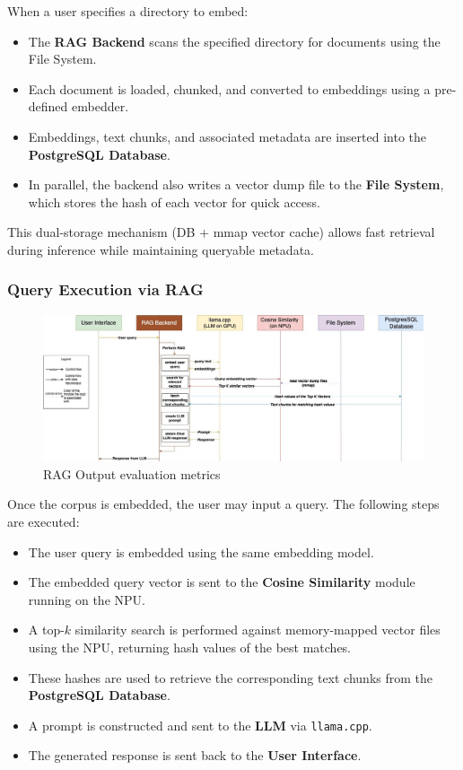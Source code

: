 {When a user specifies a directory to embed:

\begin{itemize}
    \item The \textbf{RAG Backend} scans the specified directory for documents using the File System.
    \item Each document is loaded, chunked, and converted to embeddings using a pre-defined embedder.
    \item Embeddings, text chunks, and associated metadata are inserted into the \textbf{PostgreSQL Database}.
    \item In parallel, the backend also writes a vector dump file to the \textbf{File System}, which stores the hash of each vector for quick access.
\end{itemize}

This dual-storage mechanism (DB + mmap vector cache) allows fast retrieval during inference while maintaining queryable metadata.

\subsubsection{Query Execution via RAG}

\begin{figure}[H]
    \centering
    \includegraphics[width=1.0\linewidth]{images/tldr-app-worklfow-pt3.jpg}
    \caption{RAG Output evaluation metrics ~\cite{cardenas2023rag}}
    \label{fig:autoregressive_decoding}
\end{figure}

Once the corpus is embedded, the user may input a query. The following steps are executed:

\begin{itemize}
    \item The user query is embedded using the same embedding model.
    \item The embedded query vector is sent to the \textbf{Cosine Similarity} module running on the NPU.
    \item A top-$k$ similarity search is performed against memory-mapped vector files using the NPU, returning hash values of the best matches.
    \item These hashes are used to retrieve the corresponding text chunks from the \textbf{PostgreSQL Database}.
    \item A prompt is constructed and sent to the \textbf{LLM} via \texttt{llama.cpp}.
    \item The generated response is sent back to the \textbf{User Interface}.
\end{itemize}

}
